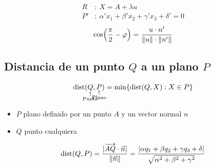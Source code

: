 \documentclass[11pt,a4paper]{article}
\DeclareMathOperator{\dist}{dist}
\begin{document}
\[
\begin{aligned}
R&:\ X=A+\lambda u\\
P'&:\ \alpha'x_1+\beta'x_2+\gamma'x_3+\delta'=0
\end{aligned}
\]
\[
\cos\Bigl(\frac{\pi}{2}-\varphi\Bigr)=\frac{u\cdot n'}{\lVert u\rVert\cdot\lVert n'\rVert}
\]

\subsection{\texorpdfstring{Distancia de un punto $Q$ a un plano $P$}{Distancia de un punto Q a un plano P}}

\[
\dist(\underset{\mathclap{\substack{\uparrow\\\text{Punto}}}}{Q},\underset{\mathclap{\substack{\uparrow\\\text{Plano}}}}{P})=\min\{\dist(Q,X):X\in P\}
\]

\begin{itemize}
  \item $P$ plano definido por un punto $A$ y un vector normal $n$
  \item $Q$ punto cualquiera
\end{itemize}
\[
\dist(Q,P)=\frac{\abs{\overrightarrow{AQ}\cdot\vec n}}{\norm{\vec n}}
=\frac{\abs{\alpha q_1+\beta q_2+\gamma q_3+\delta}}{\sqrt{\alpha^2+\beta^2+\gamma^2}}
\]

\end{document}
